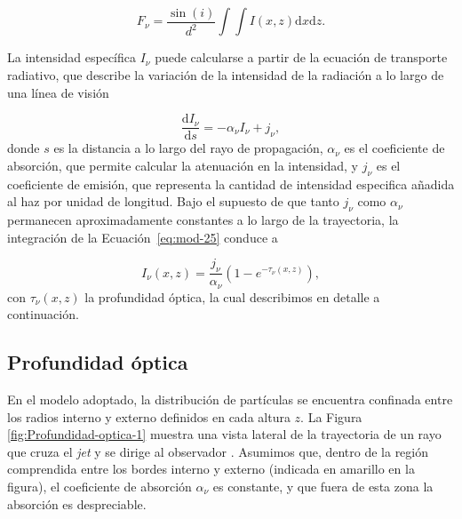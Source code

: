 \begin{equation}\label{eq:mod-24}
F_\nu=\frac{\sin(i)}{d^2}\int\int I(x,z)\mathrm{d}x\mathrm{d}z.
\end{equation}

La intensidad específica $I_\nu$ puede calcularse a partir de la ecuación de transporte radiativo, que describe la variación de la intensidad de la radiación a lo largo de una línea de visión

\begin{equation}\label{eq:mod-25}
    \frac{\mathrm{d}I_\nu}{\mathrm{d}s}=-\alpha_\nu I_\nu+j_\nu,
\end{equation}
donde $s$ es la distancia a lo largo del rayo de propagación, $\alpha_\nu$ es el coeficiente de absorción, que permite calcular la atenuación en la intensidad, y $j_\nu$ es el coeficiente de emisión, que representa la cantidad de intensidad especifica añadida al haz por unidad de longitud.
	Bajo el supuesto de que tanto $j_\nu$ como $\alpha_\nu$ permanecen aproximadamente constantes a lo largo de la trayectoria, la integración de la Ecuación~\eqref{eq:mod-25} conduce a

\begin{equation}\label{eq:mod-26}
    I_\nu(x,z)=\frac{j_\nu}{\alpha_\nu}(1-e^{-\tau_\nu(x,z)}),
\end{equation}
con $\tau_\nu(x,z)$ la profundidad óptica, la cual describimos en detalle a continuaci\'on.

\subsection{Profundidad óptica}\label{ssec:tau}

En el modelo adoptado, la distribución de partículas se encuentra confinada entre los radios interno y externo definidos en cada altura $z$. La Figura \ref{fig:Profundidad-optica-1} muestra una vista lateral de la trayectoria de un rayo que cruza el \textit{jet} y se dirige al observador . Asumimos que, dentro de la región comprendida entre los bordes interno y externo (indicada en amarillo en la figura), el coeficiente de absorción $\alpha_\nu$ es constante, y que fuera de esta zona la absorción es despreciable. 


